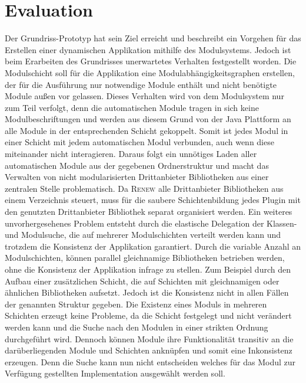 \section{Evaluation}
	Der Grundriss-Prototyp hat sein Ziel erreicht und beschreibt ein Vorgehen für das Erstellen einer dynamischen Applikation mithilfe des Modulsystems. Jedoch ist beim Erarbeiten des Grundrisses unerwartetes Verhalten festgestellt worden.
	Die Modulschicht soll für die Applikation eine Modulabhängigkeitsgraphen erstellen, der für die Ausführung nur notwendige Module enthält und nicht benötigte Module außen vor gelassen. Dieses Verhalten wird von dem Modulsystem nur zum Teil verfolgt, denn die automatischen Module tragen in sich keine Modulbeschriftungen und werden aus diesem Grund von der Java Plattform an alle Module in der entsprechenden Schicht gekoppelt. Somit ist jedes Modul in einer Schicht mit jedem automatischen Modul verbunden, auch wenn diese miteinander nicht interagieren. Daraus folgt ein unnötiges Laden aller automatischen Module aus der gegebenen Ordnerstruktur und macht das Verwalten von nicht modularisierten Drittanbieter Bibliotheken aus einer zentralen Stelle problematisch. Da \textsc{Renew} alle Drittanbieter Bibliotheken aus einem Verzeichnis steuert, muss für die saubere Schichtenbildung jedes Plugin mit den genutzten Drittanbieter Bibliothek separat organisiert werden.\newline
	Ein weiteres unvorhergesehenes Problem entsteht durch die elastische Delegation der Klassen- und Modulsuche, die auf mehrerer Modulschichten verteilt werden kann und trotzdem die Konsistenz der Applikation garantiert.
	Durch die variable Anzahl an Modulschichten, können parallel gleichnamige Bibliotheken betrieben werden, ohne die Konsistenz der Applikation infrage zu stellen. Zum Beispiel durch den Aufbau einer zusätzlichen Schicht, die auf Schichten mit gleichnamigen oder ähnlichen Bibliotheken aufsetzt. Jedoch ist die Konsistenz nicht in allen Fällen der genannten Struktur gegeben. \newline
	Die Existenz eines Moduls in mehreren Schichten erzeugt keine Probleme, da die Schicht festgelegt und nicht verändert werden kann und die Suche nach den Modulen in einer strikten Ordnung durchgeführt wird. Dennoch können Module ihre Funktionalität transitiv an die darüberliegenden Module und Schichten anknüpfen und somit eine Inkonsistenz erzeugen. Denn die Suche kann nun nicht entscheiden welches für das Modul zur Verfügung gestellten Implementation ausgewählt werden soll. \newline
